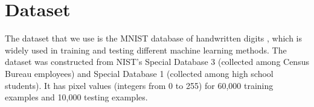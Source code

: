 \section{Dataset}
	The dataset that we use is the MNIST database of handwritten digits \cite{MNISTDatabase}, which is widely used in training and testing different machine learning methods. The dataset was constructed from NIST's Special Database 3 (collected among Census Bureau employees) and Special Database 1 (collected among high school students). It has pixel values (integers from 0 to 255) for 60,000 training examples and 10,000 testing examples. 